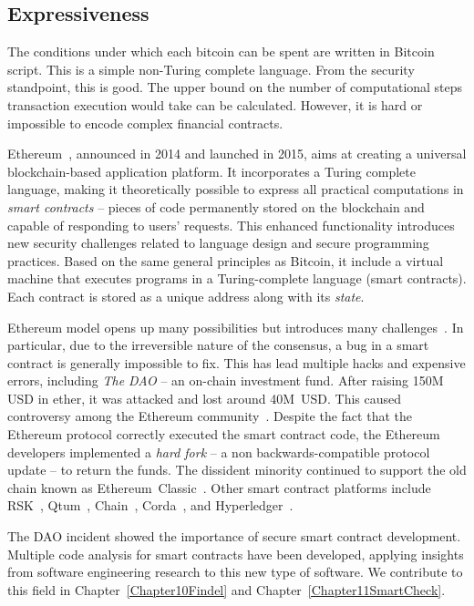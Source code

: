 \subsection{Expressiveness}

The conditions under which each bitcoin can be spent are written in Bitcoin script.
This is a simple non-Turing complete language.
From the security standpoint, this is good.
The upper bound on the number of computational steps transaction execution would take can be calculated.
However, it is hard or impossible to encode complex financial contracts.

Ethereum~\cite{Buterin2014, Wood2014}, announced in 2014 and launched in 2015, aims at creating a universal blockchain-based application platform.
It incorporates a Turing complete language, making it theoretically possible to express all practical computations in \textit{smart contracts} -- pieces of code permanently stored on the blockchain and capable of responding to users' requests.
This enhanced functionality introduces new security challenges related to language design and secure programming practices.
Based on the same general principles as Bitcoin, it include a virtual machine that executes programs in a Turing-complete language (smart contracts).
Each contract is stored as a unique address along with its \textit{state}.

Ethereum model opens up many possibilities but introduces many challenges~\cite{Bartoletti2017}.
In particular, due to the irreversible nature of the consensus, a bug in a smart contract is generally impossible to fix.
This has lead multiple hacks and expensive errors, including \textit{The DAO} -- an on-chain investment fund.
After raising 150M USD in ether, it was attacked and lost around 40M~USD.
This caused controversy among the Ethereum community~\cite{Sirer2016}.
Despite the fact that the Ethereum protocol correctly executed the smart contract code, the Ethereum developers implemented a \textit{hard fork} -- a non backwards-compatible protocol update -- to return the funds.
The dissident minority continued to support the old chain known as Ethereum~Classic~\cite{EthereumClassic}.
Other smart contract platforms include RSK~\cite{Rootstock}, Qtum~\cite{Qtum}, Chain~\cite{Chain}, Corda~\cite{Corda}, and Hyperledger~\cite{Hyperledger}.

The DAO incident showed the importance of secure smart contract development.
Multiple code analysis for smart contracts have been developed, applying insights from software engineering research to this new type of software.
We contribute to this field in Chapter~\ref{Chapter10Findel} and Chapter~\ref{Chapter11SmartCheck}.


